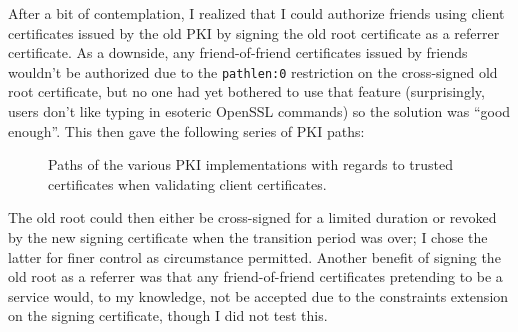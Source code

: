 \documentclass{article}
\begin{document}
After a bit of contemplation, I realized that I could authorize friends using client certificates issued by the old PKI by signing the old root certificate as a referrer certificate.  As a downside, any friend-of-friend certificates issued by friends wouldn't be authorized due to the \texttt{pathlen:0} restriction on the cross-signed old root certificate, but no one had yet bothered to use that feature (surprisingly, users don't like typing in esoteric OpenSSL commands) so the solution was ``good enough''.  This then gave the following series of PKI paths:
\begin{center}
\begin{figure}
\begin{makeimage}
\newlength{\tmp}
\end{makeimage}
\caption{Paths of the various PKI implementations with regards to trusted certificates when validating client certificates.}
\end{figure}
\end{center}
The old root could then either be cross-signed for a limited duration or revoked by the new signing certificate when the transition period was over; I chose the latter for finer control as circumstance permitted.  Another benefit of signing the old root as a referrer was that any friend-of-friend certificates pretending to be a service would, to my knowledge, not be accepted due to the constraints extension on the signing certificate, though I did not test this.
\end{document}
